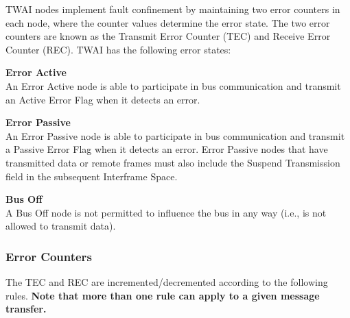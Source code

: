 \documentclass[main\_\_EN.tex]{subfiles}
\begin{document}
TWAI nodes implement fault confinement by maintaining two error counters in each node, where the counter values determine the error state. The two error counters are known as the Transmit Error Counter (TEC) and Receive Error Counter (REC). TWAI has the following error states:

{\bfseries Error Active}\\
An Error Active node is able to participate in bus communication and transmit an Active Error Flag when it detects an error.

{\bfseries Error Passive}\\
An Error Passive node is able to participate in bus communication and transmit a Passive Error Flag when it detects an error. Error Passive nodes that have transmitted data or remote frames must also include the Suspend Transmission field in the subsequent Interframe Space.

{\bfseries Bus Off}\\
A Bus Off node is not permitted to influence the bus in any way (i.e., is not allowed to transmit data).

\subsubsection{Error Counters}

The TEC and REC are incremented/decremented according to the following rules. \textbf{Note that more than one rule can apply to a given message transfer.}
\end{document}
